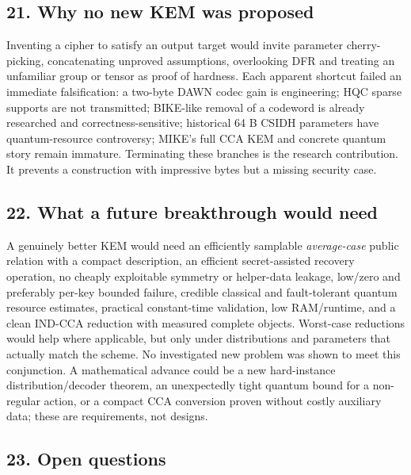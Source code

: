 \documentclass[
  10pt,
  a4paper,
]{article}
\begin{document}
\hypertarget{why-no-new-kem-was-proposed}{%
\subsection{21. Why no new KEM was
proposed}\label{why-no-new-kem-was-proposed}}

Inventing a cipher to satisfy an output target would invite parameter
cherry-picking, concatenating unproved assumptions, overlooking DFR and
treating an unfamiliar group or tensor as proof of hardness. Each
apparent shortcut failed an immediate falsification: a two-byte DAWN
codec gain is engineering; HQC sparse supports are not transmitted;
BIKE-like removal of a codeword is already researched and
correctness-sensitive; historical 64 B CSIDH parameters have
quantum-resource controversy; MIKE's full CCA KEM and concrete quantum
story remain immature. Terminating these branches is the research
contribution. It prevents a construction with impressive bytes but a
missing security case.

\hypertarget{what-a-future-breakthrough-would-need}{%
\subsection{22. What a future breakthrough would
need}\label{what-a-future-breakthrough-would-need}}

A genuinely better KEM would need an efficiently samplable
\emph{average-case} public relation with a compact description, an
efficient secret-assisted recovery operation, no cheaply exploitable
symmetry or helper-data leakage, low/zero and preferably per-key bounded
failure, credible classical and fault-tolerant quantum resource
estimates, practical constant-time validation, low RAM/runtime, and a
clean IND-CCA reduction with measured complete objects. Worst-case
reductions would help where applicable, but only under distributions and
parameters that actually match the scheme. No investigated new problem
was shown to meet this conjunction. A mathematical advance could be a
new hard-instance distribution/decoder theorem, an unexpectedly tight
quantum bound for a non-regular action, or a compact CCA conversion
proven without costly auxiliary data; these are requirements, not
designs.

\hypertarget{open-questions}{%
\subsection{23. Open questions}\label{open-questions}}
\end{document}
